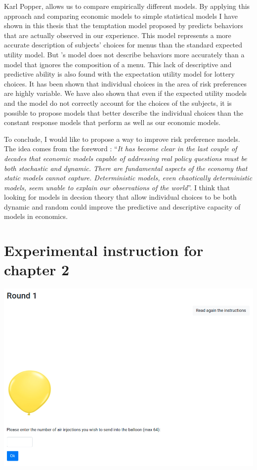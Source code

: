 \documentclass[
]{book}
\begin{document}
Karl Popper, allows us to compare empirically different models.
By applying this approach and comparing economic models to simple statistical
models I have shown in this thesis that the temptation model proposed by
\citet{gul2001temptation} predicts behaviors that are actually observed in our
experience.
This model represents a more accurate description of subjects' choices for menus
than the standard expected utility model.
But \citet{gul2001temptation}'s model does not describe behaviors more accurately than
a model that ignores the composition of a menu.
This lack of descriptive and predictive ability is also found with the
expectation utility model for lottery choices.
It has been shown that individual choices in the area of risk preferences are
highly variable.
We have also shown that even if the expected utility models and the
\citet{gul2001temptation} model do not correctly account for the choices of the
subjects, it is possible to propose models that better describe the individual
choices than the constant response models that perform as well as our economic models.

To conclude, I would like to propose a way to improve risk
preference models.
The idea comes from the foreword \citet{aliprantis2006hitchhiker}:
``\emph{It has become clear in the last couple of decades that economic
models capable of addressing real policy questions must be both stochastic
and dynamic. There are fundamental aspects of the economy that static models
cannot capture. Deterministic models, even chaotically deterministic models,
seem unable to explain our observations of the world}''.
I think that looking for models in decsion theory that allow individual choices
to be both dynamic
and random could improve the predictive and descriptive capacity of models in
economics.

\hypertarget{appendix-appendix}{%
\appendix}


\hypertarget{expe-instruc2}{%
\chapter{Experimental instruction for chapter 2}\label{expe-instruc2}}

\includegraphics[width=0.9\linewidth]{annexe_file/pump_decision}
\end{document}
